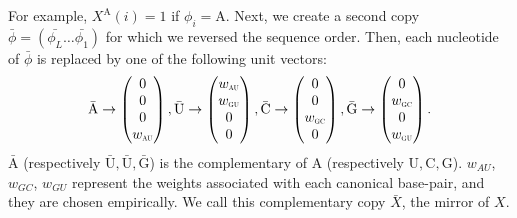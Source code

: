 For example, \(X^{\text{A}}(i) = 1\) if \(\phi_i = \text{A}\). Next, we create a second copy \(\bar{\phi}=(\bar{\phi_L}\dots \bar{\phi_1})\) for which we reversed the sequence order. Then, each nucleotide of \(\bar{\phi}\) is replaced by one of the following unit vectors:
\begin{equation}
\begin{split}
\bar{\text{A}} \rightarrow \begin{pmatrix} 0\\ 0\\ 0\\ w_{\scalebox{0.5}{AU}}\\ \end{pmatrix},
\bar{\text{U}} \rightarrow \begin{pmatrix} w_{\scalebox{0.5}{AU}}\\ w_{\scalebox{0.5}{GU}}\\ 0\\ 0\\ \end{pmatrix},
\bar{\text{C}} \rightarrow \begin{pmatrix} 0\\ 0\\ w_{\scalebox{0.5}{GC}}\\ 0\\ \end{pmatrix},
\bar{\text{G}} \rightarrow \begin{pmatrix} 0\\ w_{\scalebox{0.5}{GC}}\\ 0\\ w_{\scalebox{0.5}{GU}}\\ \end{pmatrix}.
\end{split}
\end{equation}
\(\bar{\text{A}}\) (respectively \(\bar{\text{U}}, \bar{\text{U}}, \bar{\text{G}}\)) is the complementary of \(\text{A}\) (respectively \(\text{U}, \text{C}, \text{G}\)). \(w_{AU}\), \(w_{GC}\), \(w_{GU}\) represent the weights associated with each canonical base-pair, and they are chosen empirically. We call this complementary copy \(\bar{X}\), the mirror of \(X\).

